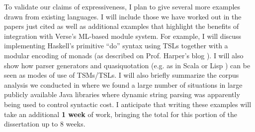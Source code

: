 To validate our claims of expressiveness, I plan to give several more examples drawn from existing languages. I will include those we have worked out in the papers just cited as well as additional examples that highlight the benefits of integration with Verse's ML-based module system. For example, I will discuss implementing Haskell's primitive ``do'' syntax using TSLs together with a modular encoding of monads (as described on Prof. Harper's blog \cite{SML/Monads}). I will also show how parser generators and quasiquotation (e.g. as in Scala \cite{shabalin2013quasiquotes} or Lisp \cite{Bawd99a}) can be seen as modes of use of TSMs/TSLs. I will also briefly summarize the corpus analysis we conducted in \cite{TSLs} where we found a large number of  situations in large publicly available Java libraries where dynamic string parsing was apparently being used to control syntactic cost. I anticipate that writing these examples will take an additional \textbf{1 week} of work, bringing the total for this portion of the dissertation up to 8 weeks. %



